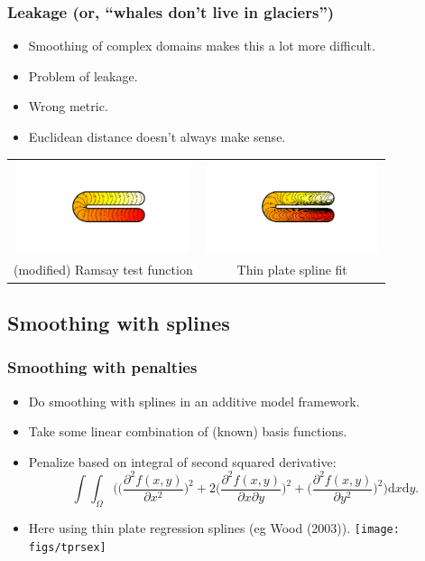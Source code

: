\documentclass[ignorenonframetext]{beamer} %
\newcommand{\bc}{\begin{center}}
\newcommand{\ec}{\end{center}}
\newcommand{\bi}{\begin{itemize}}
\newcommand{\ei}{\end{itemize}}
\begin{document}
\begin{frame}
	\frametitle{Leakage (or, ``whales don't live in glaciers'')}
       \bi
         \item Smoothing of complex domains makes this a lot more difficult.
         \item Problem of leakage.
         \item Wrong metric.
         \item Euclidean distance doesn't always make sense.
       \ei
       \bc\begin{tabular}{@{}cc}
          & \\
          \includegraphics[width=2in, trim=1in 1in 1in 1in]{figs/ramsayhorseshoe} & \includegraphics[width=2in, trim=1in 1in 1in 1in]{figs/leakageexample}\\
          (modified) Ramsay test function & Thin plate spline fit\\
       \end{tabular}\ec
\end{frame}

\subsection{Smoothing with splines}

\begin{frame}
	\frametitle{Smoothing with penalties}
      \bi
        \item Do smoothing with splines in an additive model framework.
        \item Take some linear combination of (known) basis functions.
        \item Penalize based on integral of second squared derivative:
            \begin{equation*}
	            \int\int_\Omega \Big( \Big(\frac{\partial^2 f(x,y)}{\partial x^2}\Big)^2 + 2\Big(\frac{\partial^2 f(x,y)}{\partial x \partial y}\Big)^2 + \Big(\frac{\partial^2 f(x,y)}{\partial y^2}\Big)^2\Big) \text{d}x\text{d}y.
            \end{equation*}
        \item Here using thin plate regression splines (eg Wood (2003)).
        \texttt{[image: figs/tprsex]} 
      \ei
\end{frame}
\end{document}
